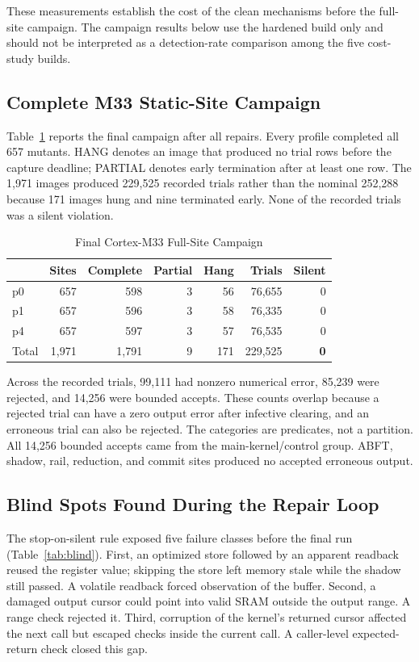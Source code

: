 \documentclass[conference]{IEEEtran}
\begin{document}
These measurements establish the cost of the clean mechanisms before the full-site campaign. The campaign results below use the hardened build only and should not be interpreted as a detection-rate comparison among the five cost-study builds.

\subsection{Complete M33 Static-Site Campaign}
Table~\ref{tab:date} reports the final campaign after all repairs. Every profile completed all 657 mutants. HANG denotes an image that produced no trial rows before the capture deadline; PARTIAL denotes early termination after at least one row. The 1,971 images produced 229,525 recorded trials rather than the nominal 252,288 because 171 images hung and nine terminated early. None of the recorded trials was a silent violation.

\begin{table}[t]
\caption{Final Cortex-M33 Full-Site Campaign}
\label{tab:date}
\centering
\begin{tabular}{lrrrrrr}
\toprule
 & Sites & Complete & Partial & Hang & Trials & Silent\\
\midrule
p0 & 657 & 598 & 3 & 56 & 76,655 & 0\\
p1 & 657 & 596 & 3 & 58 & 76,335 & 0\\
p4 & 657 & 597 & 3 & 57 & 76,535 & 0\\
\midrule
Total & 1,971 & 1,791 & 9 & 171 & 229,525 & \textbf{0}\\
\bottomrule
\end{tabular}
\end{table}

Across the recorded trials, 99,111 had nonzero numerical error, 85,239 were rejected, and 14,256 were bounded accepts. These counts overlap because a rejected trial can have a zero output error after infective clearing, and an erroneous trial can also be rejected. The categories are predicates, not a partition. All 14,256 bounded accepts came from the main-kernel/control group. ABFT, shadow, rail, reduction, and commit sites produced no accepted erroneous output.

\subsection{Blind Spots Found During the Repair Loop}
The stop-on-silent rule exposed five failure classes before the final run (Table~\ref{tab:blind}). First, an optimized store followed by an apparent readback reused the register value; skipping the store left memory stale while the shadow still passed. A volatile readback forced observation of the buffer. Second, a damaged output cursor could point into valid SRAM outside the output range. A range check rejected it. Third, corruption of the kernel's returned cursor affected the next call but escaped checks inside the current call. A caller-level expected-return check closed this gap.
\end{document}
